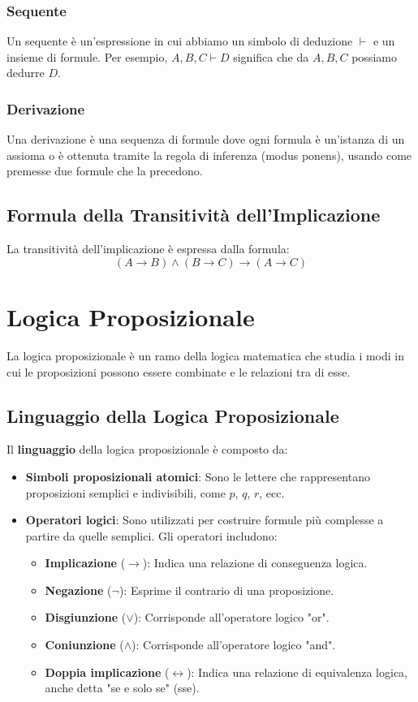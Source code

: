 \documentclass{article}
\begin{document}
\subsubsection{Sequente}
Un sequente è un'espressione in cui abbiamo un simbolo di deduzione $\vdash$ e un insieme di formule. Per esempio, $A, B, C \vdash D$ significa che da $A, B, C$ possiamo dedurre $D$.

\subsubsection{Derivazione}
Una derivazione è una sequenza di formule dove ogni formula è un'istanza di un assioma o è ottenuta tramite la regola di inferenza (modus ponens), usando come premesse due formule che la precedono.

\subsection{Formula della Transitività dell'Implicazione}
La transitività dell'implicazione è espressa dalla formula:
\[(A \rightarrow B) \land (B \rightarrow C) \rightarrow (A \rightarrow C)\]

\newpage
\section{Logica Proposizionale}

La logica proposizionale è un ramo della logica matematica che studia i modi in cui le proposizioni possono essere combinate e le relazioni tra di esse.

\subsection{Linguaggio della Logica Proposizionale}
Il \textbf{linguaggio} della logica proposizionale è composto da:
\begin{itemize}
\item \textbf{Simboli proposizionali atomici}: Sono le lettere che rappresentano proposizioni semplici e indivisibili, come $p$, $q$, $r$, ecc.
\item \textbf{Operatori logici}: Sono utilizzati per costruire formule più complesse a partire da quelle semplici. Gli operatori includono:
\begin{itemize}
\item \textbf{Implicazione} ($\rightarrow$): Indica una relazione di conseguenza logica.
\item \textbf{Negazione} ($\neg$): Esprime il contrario di una proposizione.
\item \textbf{Disgiunzione} ($\lor$): Corrisponde all'operatore logico "or".
\item \textbf{Coniunzione} ($\land$): Corrisponde all'operatore logico "and".
\item \textbf{Doppia implicazione} ($\leftrightarrow$): Indica una relazione di equivalenza logica, anche detta "se e solo se" (sse).
\end{itemize}
\end{itemize}
\end{document}
